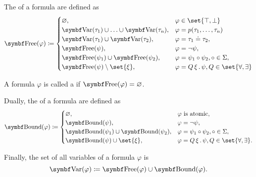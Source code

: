 \begin{definition}
\begin{defenum}
     The  of a formula are defined as
    \begin{equation}\label{eq:def:first_order_syntax/formula_free_variables}
      \bfop{Free}(\varphi) \coloneqq \begin{cases}
        \varnothing,                                            &\varphi \in \set{ \top, \bot } \\
        \bfop{Var}(\tau_1) \cup \ldots \cup \bfop{Var}(\tau_n), &\varphi = p(\tau_1, \ldots, \tau_n) \\
        \bfop{Var}(\tau_1) \cup \bfop{Var}(\tau_2),             &\varphi = \tau_1 \doteq \tau_2, \\
        \bfop{Free}(\psi),                                      &\varphi = \neg \psi, \\
        \bfop{Free}(\psi_1) \cup \bfop{Free}(\psi_2),           &\varphi = \psi_1 \circ \psi_2, \circ \in \Sigma, \\
        \bfop{Free}(\psi) \setminus \set{ \xi },                &\varphi = \quantifier{Q}{\xi} \psi, Q \in \set{ \forall, \exists }
      \end{cases}
    \end{equation}

     A formula \( \varphi \) is called a  if \( \bfop{Free}(\varphi) = \varnothing \).

     Dually, the  of a formula are defined as
    \begin{equation}\label{eq:def:first_order_syntax/formula_bound_variables}
      \bfop{Bound}(\varphi) \coloneqq \begin{cases}
        \varnothing,                                    &\varphi \text{ is atomic}, \\
        \bfop{Bound}(\psi),                             &\varphi = \neg \psi, \\
        \bfop{Bound}(\psi_1) \cup \bfop{Bound}(\psi_2), &\varphi = \psi_1 \circ \psi_2, \circ \in \Sigma, \\
        \bfop{Bound}(\psi) \cup \set{ \xi },            &\varphi = \quantifier{Q}{\xi} \psi, Q \in \set{ \forall, \exists }.
      \end{cases}
    \end{equation}

     Finally, the set of all variables of a formula \( \varphi \) is
    \begin{equation}\label{eq:def:first_order_syntax/formula_variables}
      \bfop{Var}(\varphi) \coloneqq \bfop{Free}(\varphi) \cup \bfop{Bound}(\varphi).
    \end{equation}
  \end{defenum}
\end{definition}

